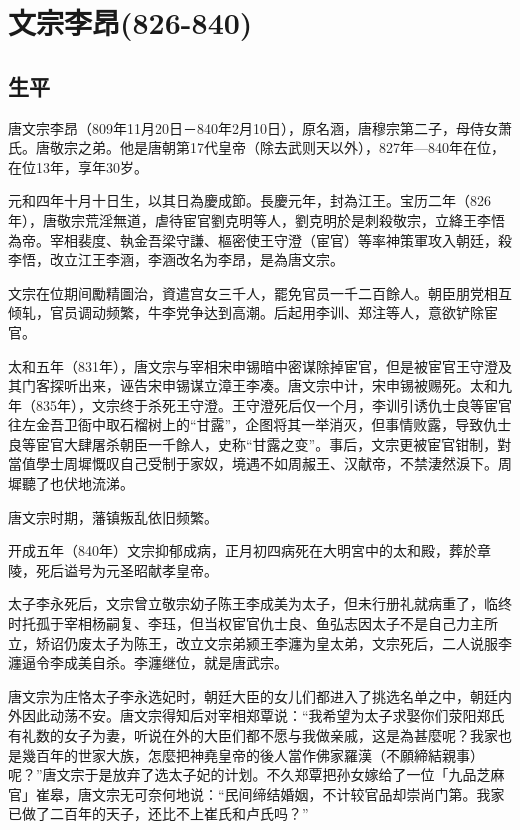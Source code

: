 
\section{文宗李昂\tiny(826-840)}

\subsection{生平}

唐文宗李昂（809年11月20日－840年2月10日），原名涵，唐穆宗第二子，母侍女萧氏。唐敬宗之弟。他是唐朝第17代皇帝（除去武则天以外），827年—840年在位，在位13年，享年30岁。

元和四年十月十日生，以其日為慶成節。長慶元年，封為江王。宝历二年（826年），唐敬宗荒淫無道，虐待宦官劉克明等人，劉克明於是刺殺敬宗，立絳王李悟為帝。宰相裴度、執金吾梁守謙、樞密使王守澄（宦官）等率神策軍攻入朝廷，殺李悟，改立江王李涵，李涵改名为李昂，是為唐文宗。

文宗在位期间勵精圖治，資遣宫女三千人，罷免官员一千二百餘人。朝臣朋党相互倾轧，官员调动频繁，牛李党争达到高潮。后起用李训、郑注等人，意欲铲除宦官。

太和五年（831年），唐文宗与宰相宋申锡暗中密谋除掉宦官，但是被宦官王守澄及其门客探听出来，诬告宋申锡谋立漳王李凑。唐文宗中计，宋申锡被赐死。太和九年（835年），文宗终于杀死王守澄。王守澄死后仅一个月，李训引诱仇士良等宦官往左金吾卫衙中取石榴树上的“甘露”，企图将其一举消灭，但事情败露，导致仇士良等宦官大肆屠杀朝臣一千餘人，史称“甘露之变”。事后，文宗更被宦官钳制，對當值學士周墀慨叹自己受制于家奴，境遇不如周赧王、汉献帝，不禁淒然淚下。周墀聽了也伏地流涕。

唐文宗时期，藩镇叛乱依旧频繁。

开成五年（840年）文宗抑郁成病，正月初四病死在大明宮中的太和殿，葬於章陵，死后谥号为元圣昭献孝皇帝。

太子李永死后，文宗曾立敬宗幼子陈王李成美为太子，但未行册礼就病重了，临终时托孤于宰相杨嗣复、李珏，但当权宦官仇士良、鱼弘志因太子不是自己力主所立，矫诏仍废太子为陈王，改立文宗弟颍王李瀍为皇太弟，文宗死后，二人说服李瀍逼令李成美自杀。李瀍继位，就是唐武宗。

唐文宗为庄恪太子李永选妃时，朝廷大臣的女儿们都进入了挑选名单之中，朝廷内外因此动荡不安。唐文宗得知后对宰相郑覃说：“我希望为太子求娶你们荥阳郑氏有礼数的女子为妻，听说在外的大臣们都不愿与我做亲戚，这是為甚麼呢？我家也是幾百年的世家大族，怎麼把神堯皇帝的後人當作佛家羅漢（不願締結親事）呢？”唐文宗于是放弃了选太子妃的计划。不久郑覃把孙女嫁给了一位「九品芝麻官」崔皋，唐文宗无可奈何地说：“民间缔结婚姻，不计较官品却崇尚门第。我家已做了二百年的天子，还比不上崔氏和卢氏吗？”

